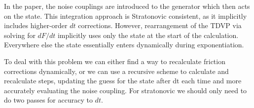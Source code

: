         In the paper, the noise couplings are introduced to the generator which then acts on the state. This integration approach is Stratonovic consistent, as it implicitly includes higher-order $dt$ corrections. However, rearrangement of the TDVP via solving for $dF/dt$ implicitly uses only the state at the start of the calculation. Everywhere else the state essentially enters dynamically during exponentiation.

        To deal with this problem we can either find a way to recalculate friction corrections dynamically, or we can use a recursive scheme to calculate and recalculate steps, updating the guess for the state after dt each time and more accurately evaluating the noise coupling. For stratonovic we should only need to do two passes for accuracy to $dt$.
    

